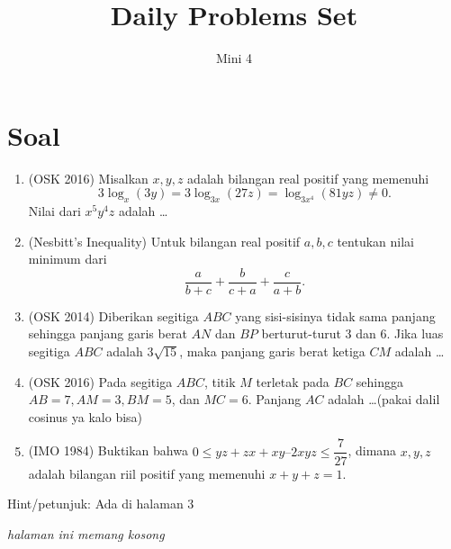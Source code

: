 \documentclass[11pt]{scrartcl}
\begin{document}
	\title{Daily Problems Set} %
	\date{}
	\author{Mini 4}
	\maketitle

	\section{Soal}
	\begin{enumerate}
            \item (OSK 2016) Misalkan $x,y,z$ adalah bilangan real positif yang memenuhi $$3 \log_x (3y) = 3 \log_{3x} (27z) = \log_{3x^4} (81yz) \neq 0.$$ Nilai dari $x^5y^4z$ adalah \dots
    
            \item (Nesbitt's Inequality) Untuk bilangan real positif $a,b,c$ tentukan nilai minimum dari $$\dfrac{a}{b+c}+\dfrac{b}{c+a}+\dfrac{c}{a+b}.$$

            \item (OSK 2014) Diberikan segitiga $ABC$ yang sisi-sisinya tidak sama panjang sehingga panjang garis berat $AN$ dan $BP$ berturut-turut 3 dan 6. Jika luas segitiga $ABC$ adalah $3\sqrt{15}$, maka panjang garis berat ketiga $CM$ adalah \dots
        
            \item (OSK 2016) Pada segitiga $ABC$, titik $M$ terletak pada $BC$ sehingga $AB=7, AM=3, BM=5$, dan $MC=6$. Panjang $AC$ adalah \dots (pakai dalil cosinus ya kalo bisa)
            
            \item (IMO 1984) Buktikan bahwa $0 \leq yz + zx + xy – 2xyz \leq \dfrac{7}{27}$, dimana $x,y,z$ adalah bilangan riil positif yang memenuhi $x + y + z = 1$.
	\end{enumerate}

        Hint/petunjuk: Ada di halaman 3

        \newpage

        \textit{halaman ini memang kosong}

        \newpage
\end{document}

